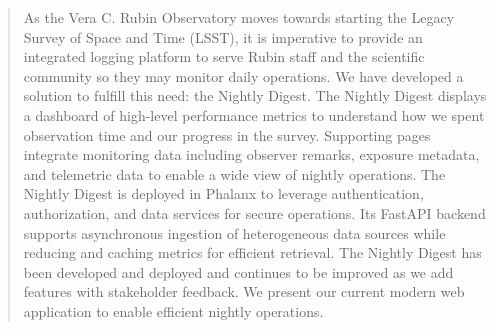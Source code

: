 
\begin{abstract}
As the Vera C. Rubin Observatory moves towards starting the Legacy Survey of Space and Time (LSST), it is imperative to provide an integrated logging platform to serve Rubin staff and the scientific community so they may monitor daily operations. We have developed a solution to fulfill this need: the Nightly Digest. The Nightly Digest displays a dashboard of high-level performance metrics to understand how we spent observation time and our progress in the survey. Supporting pages integrate monitoring data including observer remarks, exposure metadata, and telemetric data to enable a wide view of nightly operations. The Nightly Digest is deployed in Phalanx to leverage authentication, authorization, and data services for secure operations. Its FastAPI backend supports asynchronous ingestion of heterogeneous data sources while reducing and caching metrics for efficient retrieval. The Nightly Digest has been developed and deployed and continues to be improved as we add features with stakeholder feedback. We present our current modern web application to enable efficient nightly operations.
\end{abstract}

